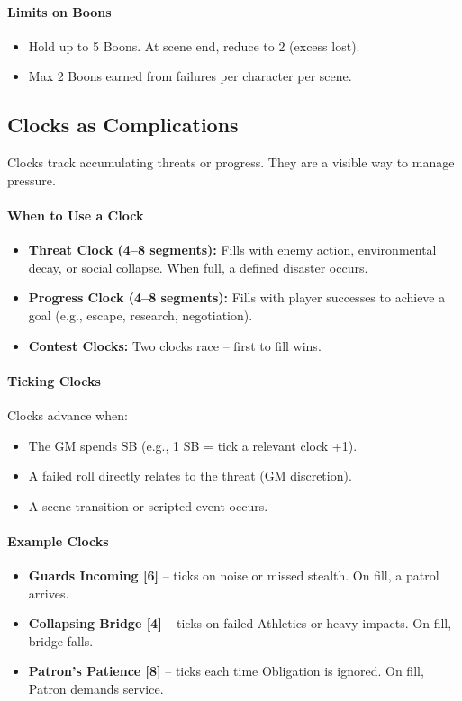 \paragraph{Limits on Boons}
\begin{itemize}
  \item Hold up to 5 Boons. At scene end, reduce to 2 (excess lost).
  \item Max 2 Boons earned from failures per character per scene.
\end{itemize}

\subsection{Clocks as Complications}
Clocks track accumulating threats or progress. They are a visible way to manage pressure.

\paragraph{When to Use a Clock}
\begin{itemize}
  \item \textbf{Threat Clock (4--8 segments):} Fills with enemy action, environmental decay, or social collapse. When full, a defined disaster occurs.
  \item \textbf{Progress Clock (4--8 segments):} Fills with player successes to achieve a goal (e.g., escape, research, negotiation).
  \item \textbf{Contest Clocks:} Two clocks race -- first to fill wins.
\end{itemize}

\paragraph{Ticking Clocks}
Clocks advance when:
\begin{itemize}
  \item The GM spends SB (e.g., 1 SB = tick a relevant clock +1).
  \item A failed roll directly relates to the threat (GM discretion).
  \item A scene transition or scripted event occurs.
\end{itemize}

\paragraph{Example Clocks}
\begin{itemize}
  \item \textbf{Guards Incoming [6]} -- ticks on noise or missed stealth. On fill, a patrol arrives.
  \item \textbf{Collapsing Bridge [4]} -- ticks on failed Athletics or heavy impacts. On fill, bridge falls.
  \item \textbf{Patron's Patience [8]} -- ticks each time Obligation is ignored. On fill, Patron demands service.
\end{itemize}

